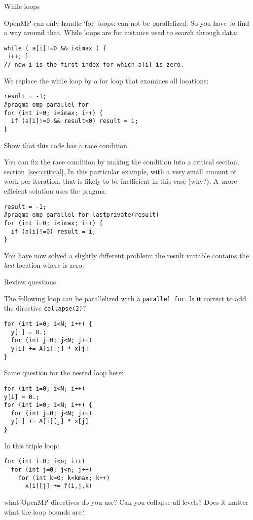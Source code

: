  {While loops}

OpenMP can only handle `for' loops:  can not
be parallelized. So you have to find a way around that. While loops
are for instance used to search through data:
\begin{lstlisting}[language=omp]
while ( a[i]!=0 && i<imax ) {
 i++; }
// now i is the first index for which a[i] is zero.
\end{lstlisting}
We replace the while loop by a for loop that examines all locations:
\begin{lstlisting}[language=omp]
result = -1;
#pragma omp parallel for
for (int i=0; i<imax; i++) {
  if (a[i]!=0 && result<0) result = i;
}
\end{lstlisting}
\begin{exercise}
  Show that this code has a race condition.
\end{exercise}
You can fix the race condition by making the condition into a critical section;
section~\ref{sec:critical}. In this particular example, with a very small amount
of work per iteration, that is likely to be inefficient 
in this case (why?).
A~more efficient solution uses the  pragma:
\begin{lstlisting}[language=omp]
result = -1;
#pragma omp parallel for lastprivate(result)
for (int i=0; i<imax; i++) {
  if (a[i]!=0) result = i;
}
\end{lstlisting}
You have now solved a slightly different problem: the result variable
contains the \emph{last} location where  is zero.

 {Review questions}

\begin{exercise}
  The following loop can be parallelized with a \lstinline[language=omp]+parallel for+.
  Is it correct to add the directive \lstinline[language=omp]+collapse(2)+?

\begin{lstlisting}[language=omp]
for (int i=0; i<N; i++) {
  y[i] = 0.;
  for (int j=0; j<N; j++)
  y[i] += A[i][j] * x[j]
}
\end{lstlisting}
\end{exercise}

\begin{exercise}
  Same question for the nested loop here:

\begin{lstlisting}[language=omp]
for (int i=0; i<N; i++)
y[i] = 0.;
for (int i=0; i<N; i++) {
  for (int j=0; j<N; j++)
  y[i] += A[i][j] * x[j]
}
\end{lstlisting}
\end{exercise}

\begin{exercise}
  In this triple loop:
\begin{lstlisting}[language=omp]
for (int i=0; i<n; i++)
  for (int j=0; j<n; j++)
    for (int k=0; k<kmax; k++)
      x[i][j] += f(i,j,k)
\end{lstlisting}
what OpenMP directives do you use?
Can you collapse all levels?
Does it matter what the loop bounds are?
\end{exercise}
